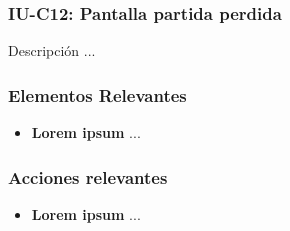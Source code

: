
\subsubsection{IU-C12: Pantalla partida perdida}

 Descripción ...


\subsubsection{Elementos Relevantes}

    \begin{itemize}
    \item {\bf Lorem ipsum}
        ...
    \end{itemize}

\subsubsection{Acciones relevantes}

    \begin{itemize}
    \item {\bf Lorem ipsum}
        ...
    \end{itemize}

\clearpage
